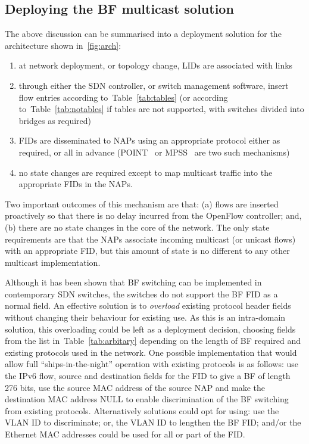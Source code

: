\documentclass[conference]{IEEEtran}
\newcommand{\tabref}[1]{Table~\ref{#1}}
\begin{document}
\subsection{Deploying  the BF multicast solution}
\label{sec:summary-bf-multicast}

The above discussion can be summarised into a deployment solution for the architecture shown in~\ref{fig:arch}:
\begin{enumerate}
\item at network deployment, or topology change, LIDs are associated with links~\cite{Jokela09}
\item through either the SDN controller, or switch management software, insert flow entries according to~\tabref{tab:tables} (or according to~\tabref{tab:notables} if tables are not supported, with switches divided into bridges as required)
\item FIDs are disseminated to NAPs using an appropriate protocol either as required, or all in advance (POINT~\cite{Trossen2015} or MPSS~\cite{Zahemszky2010} are two such mechanisms)
\item no state changes are required except to map multicast traffic into the appropriate FIDs in the NAPs.
\end{enumerate}

Two important outcomes of this mechanism are that: (a) flows are inserted proactively so that there is no delay incurred from the OpenFlow controller; and, (b) there are no state changes in the core of the network. The only state requirements are that the NAPs associate incoming multicast (or unicast flows) with an appropriate FID, but this amount of state is no different to any other multicast implementation.

Although it has been shown that BF switching can be implemented in contemporary SDN switches, the switches do not support the BF FID as a normal field. An effective solution is to \emph{overload} existing protocol header fields without changing their behaviour for existing use. As this is an intra-domain solution, this overloading could be left as a deployment decision, choosing fields from the list in~\tabref{tab:arbitary} depending on the length of BF required and existing protocols used in the network. One possible implementation that would allow full ``ships-in-the-night'' operation with existing protocols is as follows:  use the IPv6 flow, source and destination fields for the FID to give a BF of length 276 bits, use the source MAC address of the source NAP and make the destination MAC address NULL to enable discrimination of the BF switching from existing protocols. Alternatively solutions could opt for using: use the VLAN ID to discriminate; or, the VLAN ID to lengthen the BF FID; and/or the Ethernet MAC addresses could be used for all or part of the FID.
\end{document}
